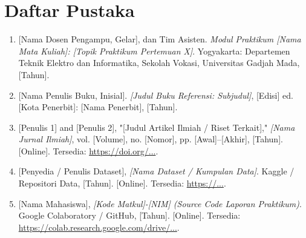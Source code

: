 \documentclass[a4paper,oneside,11pt]{book}
\begin{document}
\chapter{Daftar Pustaka}
\label{chap:daftarpustaka}

\begin{enumerate}
    \item \label{modulPraktikum} [Nama Dosen Pengampu, Gelar], dan Tim Asisten. \textit{Modul Praktikum [Nama Mata Kuliah]: [Topik Praktikum Pertemuan X]}. Yogyakarta: Departemen Teknik Elektro dan Informatika, Sekolah Vokasi, Universitas Gadjah Mada, [Tahun].
    
    \item \label{bukuTeks} [Nama Penulis Buku, Inisial]. \textit{[Judul Buku Referensi: Subjudul]}, [Edisi] ed. [Kota Penerbit]: [Nama Penerbit], [Tahun].
    
    \item \label{jurnalIlmiah} [Penulis 1] and [Penulis 2], "[Judul Artikel Ilmiah / Riset Terkait]," \textit{[Nama Jurnal Ilmiah]}, vol. [Volume], no. [Nomor], pp. [Awal]--[Akhir], [Tahun]. [Online]. Tersedia: \url{https://doi.org/...}.
    
    \item \label{sumberDataset} [Penyedia / Penulis Dataset], \textit{[Nama Dataset / Kumpulan Data]}. Kaggle / Repositori Data, [Tahun]. [Online]. Tersedia: \url{https://...}.
    
    \item \label{sourceCode} [Nama Mahasiswa], \textit{[Kode Matkul]-[NIM] (Source Code Laporan Praktikum)}. Google Colaboratory / GitHub, [Tahun]. [Online]. Tersedia: \url{https://colab.research.google.com/drive/...}.
\end{enumerate}
\end{document}

